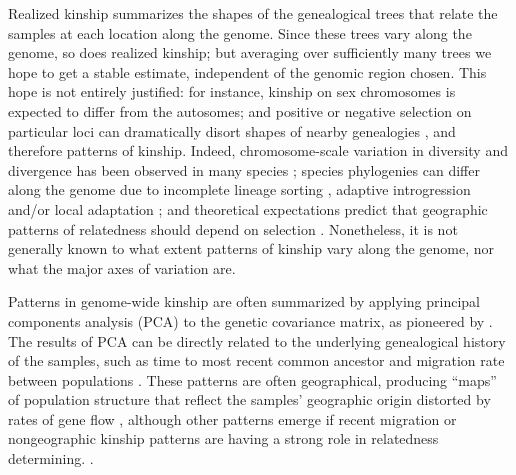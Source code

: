 \documentclass[11pt, oneside]{article}   	%
\begin{document}
Realized kinship summarizes the shapes
of the genealogical trees that relate the samples
at each location along the genome.
Since these trees vary along the genome, so does realized kinship;
but averaging over sufficiently many trees we hope to get a stable estimate,
independent of the genomic region chosen.
This hope is not entirely justified: for instance,
kinship on sex chromosomes is expected to differ from the autosomes;
and positive or negative selection on particular loci can dramatically disort shapes of nearby genealogies
\citep{maynardsmith1974hitchhiking,barton2000genetic,neher2013genetic,charlesworth2012effects},
and therefore patterns of kinship.
Indeed,
chromosome-scale variation in diversity and divergence has been observed in many species
\citep[e.g.][]{langley2012genomic};
species phylogenies can differ along the genome 
due to incomplete lineage sorting \citep[e.g.][]{pease2013accurate},
adaptive introgression and/or local adaptation \citep[e.g.][]{ellegren2012genomic,nadeau2012genomic,pool2015natural,vernot2014resurrecting};
and theoretical expectations predict that geographic patterns of relatedness should depend on selection
\citep{charlesworth2003review}.
Nonetheless, it is not generally known to what extent patterns of kinship vary along the genome,
nor what the major axes of variation are.


Patterns in genome-wide kinship are often summarized
by applying principal components analysis (PCA) \citep{patterson2006population} 
to the genetic covariance matrix,
as pioneered by \citet{menozzi1978synthetic}.
The results of PCA can be directly related to the underlying genealogical history of the samples, 
such as time to most recent common ancestor and migration rate between populations \citep{novembre2008interpreting,mcvean2009genealogical}. 
These patterns are often geographical, producing ``maps'' of population structure
that reflect the samples' geographic origin distorted by rates of gene flow
\citep{novembre2008genes},
although other patterns emerge if recent migration or nongeographic kinship patterns are having a strong role in relatedness determining.
\citep{astle2009population}.
\end{document}
